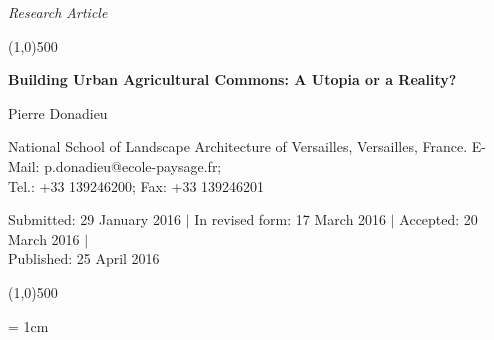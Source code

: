 \documentclass[10pt,a4paper]{article}
\begin{document}
\flushcolumns
\raggedcolumns



\pagestyle{document}
\thispagestyle{firstpage}


\vspace*{70pt}

\setlength{\parindent}{0cm}
\textit{Research Article}
\vspace*{-12pt}

\begin{center}
\line(1,0){500}
\end{center}

\vspace*{12pt}
\begin{flushleft}
\begin{LARGE}
\textbf{{\color{librellogreen} Building Urban Agricultural Commons: A Utopia or a Reality?}}\\
\end{LARGE}

\vspace*{12pt}
Pierre Donadieu

\vspace*{6pt}

National School of Landscape Architecture of Versailles, Versailles, France. E-Mail: p.donadieu@ecole-paysage.fr;\\ Tel.: +33 139246200; Fax: +33 139246201


\vspace*{6pt}

Submitted: 29 January 2016 $\mid$ In revised form: 17 March 2016 $\mid$ Accepted: 20 March 2016 $\mid$\\
Published: 25 April 2016
\end{flushleft}
\setcounter{page}{3}


\vspace*{-18pt}
\begin{center}
\line(1,0){500}
\end{center}

\vspace*{12pt}

\begingroup\leftskip= 1cm\rightskip 1cm  
\end{document}
